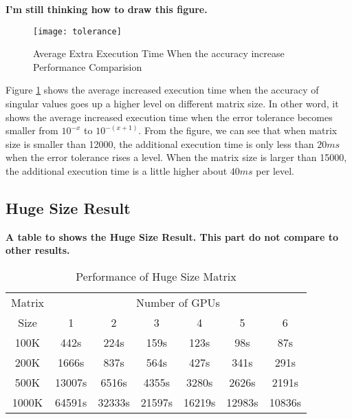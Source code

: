 \textbf{I'm still thinking how to draw this figure.}
\begin{figure}[hbpt]
\centering
\texttt{[image: tolerance]}
\caption{Average Extra Execution Time When the accuracy increase Performance Comparision}
\label{fig:tolerance}
\end{figure}
Figure \ref{fig:tolerance} shows the average increased execution time when the accuracy of singular values goes up a higher level on different matrix size.
In other word, it shows the average increased execution time when the error tolerance becomes smaller from $10^{-x}$ to $10^{-(x+1)}$.
From the figure, we can see that when matrix size is smaller than 12000, the additional execution time is only less than $20 ms$ when the error tolerance rises a level.
When the matrix size is larger than 15000, the additional execution time is a little higher about $40 ms$ per level.


\subsection{Huge Size Result}
\textbf{A table to shows the Huge Size Result. This part do not compare to other results.} 

\begin{table}[h]
\caption{Performance of Huge Size Matrix}
\centering
\begin{tabular}{|c|c|c|c|c|c|c|}
\hline
Matrix & \multicolumn{6}{|c|}{Number of GPUs} \\ \cline{2-7}
Size & 1 & 2 & 3 & 4 & 5 & 6 \\ \hline
100K   &   442s  &   224s  &   159s  &   123s  &    98s  &    87s\\ \hline
200K   &  1666s  &   837s  &   564s  &   427s  &   341s  &   291s\\ \hline
500K   & 13007s  &  6516s  &  4355s  &  3280s  &  2626s  &  2191s\\ \hline
1000K  & 64591s  & 32333s  & 21597s  & 16219s  & 12983s  & 10836s\\ \hline
\end{tabular}
\label{tab:hresult}
\end{table}

